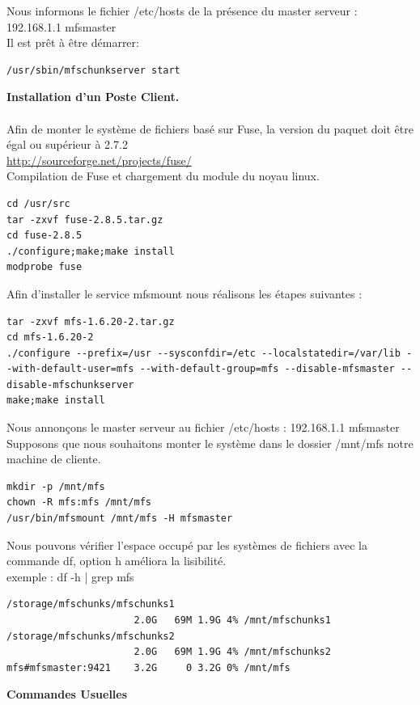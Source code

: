 \documentclass[12pt]{report}
\begin{document}
Nous informons le fichier /etc/hosts de la présence du master serveur : 192.168.1.1 mfsmaster\\
Il est prêt à être démarrer:
  \begin{lstlisting}
/usr/sbin/mfschunkserver start
	  \end{lstlisting}
\textbf{Installation d'un Poste Client.}\\\\
Afin de monter le système de fichiers basé sur Fuse, la version du paquet doit être égal ou supérieur à 2.7.2\\
\href{http://sourceforge.net/projects/fuse/}{http://sourceforge.net/projects/fuse/} \\
Compilation de Fuse et chargement du module du noyau linux.\\
  \begin{lstlisting}
cd /usr/src
tar -zxvf fuse-2.8.5.tar.gz
cd fuse-2.8.5
./configure;make;make install
modprobe fuse
	  \end{lstlisting}
Afin d'installer le service mfsmount nous réalisons les étapes suivantes :
  \begin{lstlisting}
tar -zxvf mfs-1.6.20-2.tar.gz
cd mfs-1.6.20-2
./configure --prefix=/usr --sysconfdir=/etc --localstatedir=/var/lib --with-default-user=mfs --with-default-group=mfs --disable-mfsmaster --disable-mfschunkserver
make;make install
	  \end{lstlisting}
Nous annonçons le master serveur au fichier /etc/hosts : 192.168.1.1   mfsmaster\\
Supposons que nous souhaitons monter le système dans le dossier /mnt/mfs notre machine de cliente.\\
  \begin{lstlisting}
mkdir -p /mnt/mfs
chown -R mfs:mfs /mnt/mfs
/usr/bin/mfsmount /mnt/mfs -H mfsmaster
	  \end{lstlisting}
Nous pouvons vérifier l'espace occupé par les systèmes de fichiers avec la commande df, option h améliora la lisibilité.\\
exemple : df -h | grep mfs\\
  \begin{lstlisting}
/storage/mfschunks/mfschunks1
                      2.0G   69M 1.9G 4% /mnt/mfschunks1
/storage/mfschunks/mfschunks2
                      2.0G   69M 1.9G 4% /mnt/mfschunks2
mfs#mfsmaster:9421    3.2G     0 3.2G 0% /mnt/mfs
	  \end{lstlisting}
\textbf{Commandes Usuelles}\\\\
\end{document}
